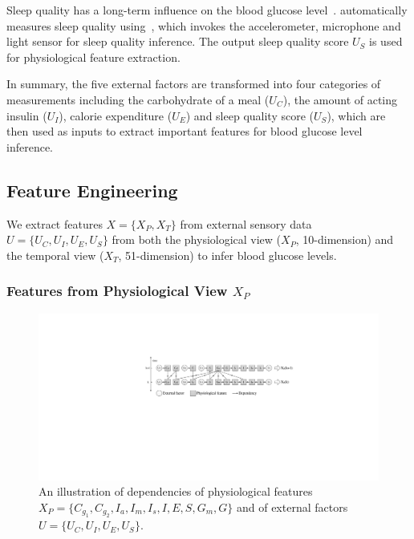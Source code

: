 Sleep quality has a long-term influence on the blood glucose level~\cite{bib:DRCP15:Iwasaki}.
\sysname automatically measures sleep quality using~\cite{bib:UbiComp14:Gu}, which invokes the accelerometer, microphone and light sensor for sleep quality inference.
The output sleep quality score $U_S$ is used for physiological feature extraction.

In summary, the five external factors are transformed into four categories of measurements including the carbohydrate of a meal ($U_C$), the amount of acting insulin ($U_I$), calorie expenditure ($U_E$) and sleep quality score ($U_S$), which are then used as inputs to extract important features for blood glucose level inference.

\subsection{Feature Engineering}
\label{subsec:features}
We extract features $X=\{X_P, X_T\}$ from external sensory data $U=\{U_C, U_I, U_E, U_S\}$ from both the physiological view ($X_P$, 10-dimension) and the temporal view ($X_T$, 51-dimension) to infer blood glucose levels.

\subsubsection{Features from Physiological View $X_P$}
\label{subsubsec:physiological}
\begin{figure}[h]
  \centering
  \includegraphics[width=0.9\columnwidth]{./img/Physiological_correlation2.pdf}
  \caption{An illustration of dependencies of physiological features $X_P=\{C_{g_1}, C_{g_2}, I_{a}, I_{m}, I_{s}, I, E, S,  G_{m}, G\}$ and of external factors $U=\{U_C, U_I, U_E, U_S\}$.}
  \label{fig:phymodel}
\end{figure}

